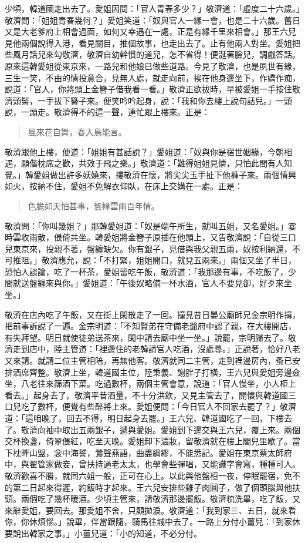 少頃，韓道國走出去了。愛姐因問：「官人青春多少？」敬濟道：「虛度二十六歲。」敬濟問：「姐姐青春幾何？」愛姐笑道：「奴與官人一緣一會，也是二十六歲。舊日又是大老爹府上相會過面，如何又幸遇在一處，正是有緣千里來相會。」那王六兒見他兩個說得入港，看見關目，推個故事，也走出去了。止有他兩人對坐。愛姐把些風月話兒來勾敬濟，敬濟自幼幹慣的道兒，怎不省得！便涎著臉兒，調戲答話。原來這韓愛姐從東京來，一路兒和他娘已做些道路。今見了敬濟，也是夙世有緣，三生一笑，不由的情投意合，見無人處，就走向前，挨在他身邊坐下，作嬌作痴，說道：「官人，你將頭上金簪子借我看一看。」敬濟正欲拔時，早被愛姐一手按住敬濟頭髻，一手拔下簪子來。便笑吟吟起身，說：「我和你去樓上說句話兒。」一頭說，一頭走。敬濟得不的這一聲，連忙跟上樓來。正是：
\begin{quote}
風來花自舞，春入鳥能言。
\end{quote}

敬濟跟他上樓，便道：「姐姐有甚話說？」愛姐道：「奴與你是宿世姻緣，今朝相遇，願偕枕席之歡，共效于飛之樂。」敬濟道：「難得姐姐見憐，只怕此間有人知覺。」韓愛姐做出許多妖嬈來，摟敬濟在懷，將尖尖玉手扯下他褲子來。兩個情興如火，按納不住，愛姐不免解衣仰臥，在床上交媾在一處。正是：
\begin{quote}
色膽如天怕甚事，鴛幃雲雨百年情。
\end{quote}

敬濟問：「你叫幾姐？」那韓愛姐道：「奴是端午所生，就叫五姐，又名愛姐。」霎時雲收雨散，偎倚共坐。韓愛姐將金簪子原插在他頭上，又告敬濟說：「自從三口兒東京來，投親不著，盤纏缺欠。你有銀子，見借與我父親五兩，奴按利納還，不可推阻。」敬濟應允，說：「不打緊，姐姐開口，就兌五兩來。」兩個又坐了半日，恐怕人談論，吃了一杯茶，愛姐留吃午飯，敬濟道：「我那邊有事，不吃飯了，少間就送盤纏來與你。」愛姐道：「午後奴略備一杯水酒，官人不要見卻，好歹來坐坐。」

敬濟在店內吃了午飯，又在街上閑散走了一回。撞見昔日晏公廟師兄金宗明作揖，把前事訴說了一遍。金宗明道：「不知賢弟在守備老爺府中認了親，在大樓開店，有失拜望。明日就使徒弟送茶來，閑中請去廟中坐一坐。」說罷，宗明歸去了。敬濟走到店中，陸主管道：「裡邊住的老韓請官人吃酒，沒處尋。」正說著，恰好八老又來請。就請二位主管相陪，再無他客。敬濟就同二主管，走到裡邊房內，蚤已安排酒席齊整。敬濟上坐，韓道國主位，陸秉義、謝胖子打橫，王六兒與愛姐旁邊僉坐，八老往來篩酒下菜。吃過數杯，兩個主管會意，說道：「官人慢坐，小人柜上看去。」起身去了。敬濟平昔酒量，不十分洪飲，又見主管去了，開懷與韓道國三口兒吃了數杯，便覺有些醉將上來。愛姐便問：「今日官人不回家去罷了？」敬濟道：「這咱晚了，回去不得，明日起身去罷。」王六兒、韓道國吃了一回，下樓去了。敬濟向袖中取出五兩銀子，遞與愛姐。愛姐到下邊交與王六兒，覆上來。兩個交杯換盞，倚翠偎紅，吃至天晚。愛姐卸下濃妝，留敬濟就在樓上閣兒里歇了。當下枕畔山盟，衾中海誓，鶯聲燕語，曲盡綢繆，不能悉記。愛姐在東京蔡太師府中，與翟管家做妾，曾扶持過老太太，也學會些彈唱，又能識字會寫，種種可人。敬濟歡喜不勝，就同六姐一般，正可在心上。以此與他盤桓一夜，停眠罷宿，免不的第二日起來得遲，約飯時才起來。王六兒安排些雞子肉圓子，做了個頭腦與他扶頭。兩個吃了幾杯暖酒。少頃主管來，請敬濟那邊擺飯。敬濟梳洗畢，吃了飯，又來辭愛姐，要回去。那愛姐不舍，只顧拋淚。敬濟道：「我到家三、五日，就來看你，你休煩惱。」說畢，伴當跟隨，騎馬往城中去了。一路上分付小薑兒：「到家休要說出韓家之事。」小薑兒道：「小的知道，不必分付。

